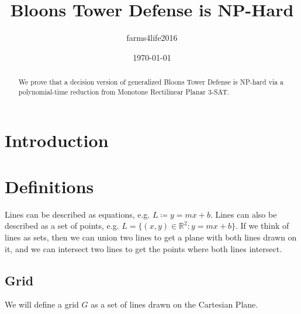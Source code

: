 \newcommand{\NP}{\mathrm{NP}}
\newcommand{\PClass}{\mathrm{P}}
\newcommand{\SAT}{\mathrm{SAT}}
\newcommand{\VC}{\mathrm{VC}}
\newcommand{\BTD}{\mathrm{BTD}}
\newcommand{\Z}{\mathbb{Z}}
\newcommand{\R}{\mathbb{R}}
\newcommand{\rT}{\sqrt{3}}

\title{Bloons Tower Defense is NP-Hard}
\author{farms4life2016}
\date{\today}

\setlength{\parindent}{0pt}



\maketitle

\begin{abstract}
We prove that a decision version of generalized Bloons Tower Defense is NP-hard via a polynomial-time reduction from Monotone Rectilinear Planar 3-SAT.
\end{abstract}

\tableofcontents

\newpage

\section{Introduction}


\section{Definitions}

Lines can be described as equations, e.g. $L \coloneqq y = mx + b$.
Lines can also be described as a set of points, e.g. $L = \{ (x,y) \in \R^2 : y=mx+b \}$.
If we think of lines as sets, then we can union two lines to get a plane with both lines drawn on it, and we can intersect two lines to get the points where both lines intersect.

\subsection{Grid}

We will define a grid $G$ as a set of lines drawn on the Cartesian Plane.

